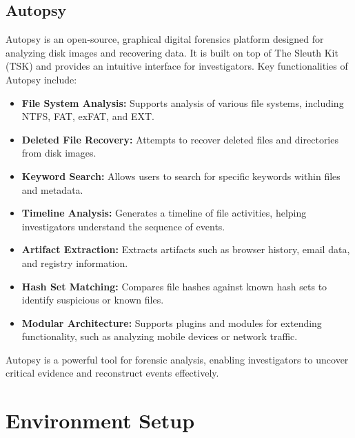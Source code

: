 \documentclass[11pt]{article}
\begin{document}
\subsection{Autopsy}
Autopsy is an open-source, graphical digital forensics platform designed for analyzing disk images and recovering data. It is built on top of The Sleuth Kit (TSK) and provides an intuitive interface for investigators. Key functionalities of Autopsy include:
\begin{itemize}
    \item \textbf{File System Analysis:} Supports analysis of various file systems, including NTFS, FAT, exFAT, and EXT.
    \item \textbf{Deleted File Recovery:} Attempts to recover deleted files and directories from disk images.
    \item \textbf{Keyword Search:} Allows users to search for specific keywords within files and metadata.
    \item \textbf{Timeline Analysis:} Generates a timeline of file activities, helping investigators understand the sequence of events.
    \item \textbf{Artifact Extraction:} Extracts artifacts such as browser history, email data, and registry information.
    \item \textbf{Hash Set Matching:} Compares file hashes against known hash sets to identify suspicious or known files.
    \item \textbf{Modular Architecture:} Supports plugins and modules for extending functionality, such as analyzing mobile devices or network traffic.
\end{itemize}
Autopsy is a powerful tool for forensic analysis, enabling investigators to uncover critical evidence and reconstruct events effectively.

\section{Environment Setup}
\end{document}
